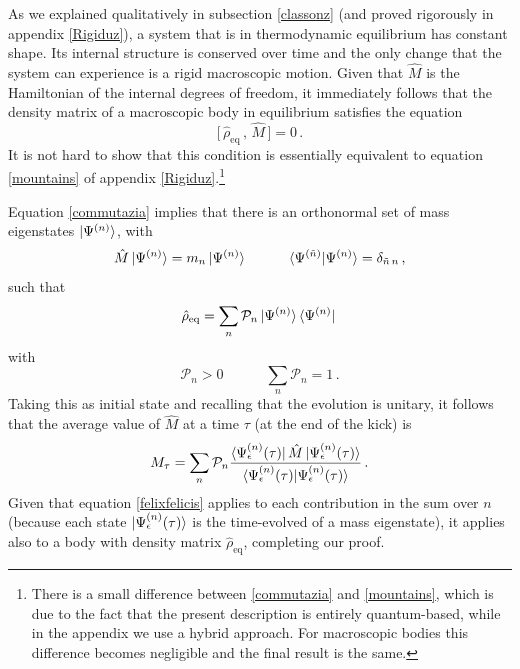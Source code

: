\documentclass[twocolumn,usenatbib]{mnras2}
\newcommand{\spc}{\quad \quad \quad}
\begin{document}
As we explained qualitatively in subsection \ref{classonz} (and proved rigorously in appendix \ref{Rigiduz}), a system that is in thermodynamic equilibrium has constant shape. Its internal structure is conserved over time and the only change that the system can experience is a rigid macroscopic motion. Given that $\hat{M}$ is the Hamiltonian of the internal degrees of freedom, it immediately follows that the density matrix of a macroscopic body in equilibrium satisfies the equation
\begin{equation}\label{commutazia}
    \Big[ \, \hat{\rho}_{\text{eq}} \, , \, \hat{M} \, \Big] =0 \, .
\end{equation}
It is not hard to show that this condition is essentially equivalent to equation \eqref{mountains} of appendix \ref{Rigiduz}.\footnote{There is a small difference between \eqref{commutazia} and \eqref{mountains}, which is due to the fact that the present description is entirely quantum-based, while in the appendix we use a hybrid approach. For macroscopic bodies this difference becomes negligible and the final result is the same.}

Equation \eqref{commutazia} implies that there is an orthonormal set of mass eigenstates $\ket{\Psi^{(n)}}$, with
\begin{equation}
    \hat{M}\ket{\Psi^{(n)}} = m_n \ket{\Psi^{(n)}}  \spc \braket{\Psi^{(\tilde{n})} | \Psi^{(n)}} = \delta_{\tilde{n} \, n} \, ,
\end{equation}
such that 
\begin{equation}
\hat{\rho}_{\text{eq}} = \sum_n \mathcal{P}_n \ket{\Psi^{(n)}} \bra{\Psi^{(n)}} \, 
\end{equation}
with
\begin{equation}
    \mathcal{P}_n >0 \spc  \sum_n \mathcal{P}_n =1   \, .
\end{equation}
Taking this as initial state and recalling that the evolution is unitary, it follows that the average value of $\hat{M}$ at a time $\tau$ (at the end of the kick) is
\begin{equation}
    M_\tau = \sum_n \mathcal{P}_n \dfrac{\bra{\Psi^{(n)}_\epsilon(\tau)} \hat{M}\ket{\Psi^{(n)}_\epsilon(\tau)}}{\braket{\Psi^{(n)}_\epsilon(\tau) |\Psi^{(n)}_\epsilon(\tau)}}  \, .
\end{equation}
Given that equation \eqref{felixfelicis} applies to each contribution in the sum over $n$ (because each state $\ket{\Psi^{(n)}_\epsilon(\tau)}$ is the time-evolved of a mass eigenstate), it applies also  to  a  body  with density matrix $\hat{\rho}_{\text{eq}}$, completing our proof.
\end{document}
